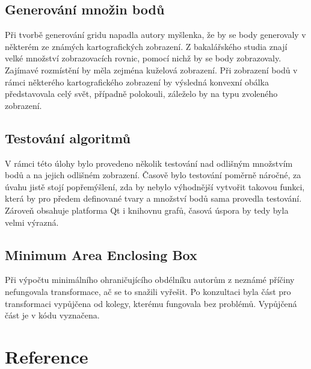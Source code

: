 \documentclass[a4paper, 12pt]{article}
\begin{document}
\subsection{Generování množin bodů}
Při tvorbě generování gridu napadla autory myšlenka, že by se body generovaly v některém ze známých kartografických zobrazení. Z bakalářského studia znají velké množství zobrazovacích rovnic, pomocí nichž by se body zobrazovaly. Zajímavé rozmístění by měla zejména kuželová zobrazení. Při zobrazení bodů v rámci některého kartografického zobrazení by výsledná konvexní obálka představovala celý svět, případně polokouli, záleželo by na typu zvoleného zobrazení.

\subsection{Testování algoritmů}
V rámci této úlohy bylo provedeno několik testování nad odlišným množstvím bodů a na jejich odlišném zobrazení. Časově bylo testování poměrně náročné, za úvahu jistě stojí popřemýšlení, zda by nebylo výhodnější vytvořit takovou funkci, která by pro předem definované tvary a množství bodů sama provedla testování. Zároveň obsahuje platforma Qt i knihovnu grafů, časová úspora by tedy byla velmi výrazná.


\subsection{Minimum Area Enclosing Box}
Při výpočtu minimálního ohraničujícího obdélníku autorům z neznámé příčiny nefungovala transformace, ač se to snažili vyřešit. Po konzultaci byla část pro transformaci vypůjčena od kolegy, kterému fungovala bez problémů. Vypůjčená část je v kódu vyznačena. 





\clearpage
\section{Reference}
\end{document}
